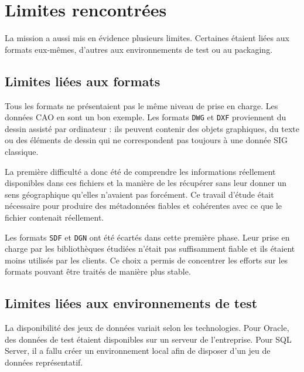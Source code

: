 
\section{Limites rencontrées}
\label{sec:limites_rencontrees}

La mission a aussi mis en évidence plusieurs limites. Certaines étaient liées
aux formats eux-mêmes, d'autres aux environnements de test ou au packaging.

\subsection{Limites liées aux formats}
\label{subsec:limites_formats}

Tous les formats ne présentaient pas le même niveau de prise en charge. Les
données CAO en sont un bon exemple. Les formats \texttt{DWG} et \texttt{DXF}
proviennent du dessin assisté par ordinateur : ils peuvent contenir des objets
graphiques, du texte ou des éléments de dessin qui ne correspondent pas toujours
à une donnée SIG classique.

La première difficulté a donc été de comprendre les informations réellement
disponibles dans ces fichiers et la manière de les récupérer sans leur donner un
sens géographique qu'elles n'avaient pas forcément. Ce travail d'étude était
nécessaire pour produire des métadonnées fiables et cohérentes avec ce que le
fichier contenait réellement.

Les formats \texttt{SDF} et \texttt{DGN} ont été écartés dans cette première
phase. Leur prise en charge par les bibliothèques étudiées n'était pas
suffisamment fiable et ils étaient moins utilisés par les clients. Ce choix a
permis de concentrer les efforts sur les formats pouvant être traités de manière
plus stable.

\subsection{Limites liées aux environnements de test}
\label{subsec:limites_environnements_test}

La disponibilité des jeux de données variait selon les technologies. Pour
Oracle, des données de test étaient disponibles sur un serveur de l'entreprise.
Pour SQL Server, il a fallu créer un environnement local afin de disposer d'un
jeu de données représentatif.

